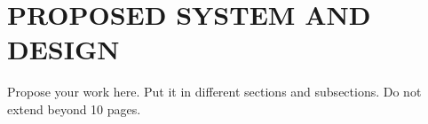 \chapter{PROPOSED SYSTEM AND DESIGN}
\par Propose your work here. Put it in different sections and subsections. Do not extend beyond 10 pages.
\newpage
